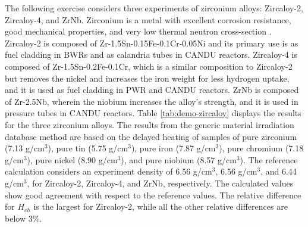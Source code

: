 The following exercise considers three experiments of zirconium alloys: Zircaloy-2, Zircaloy-4, and ZrNb.
Zirconium is a metal with excellent corrosion resistance, good mechanical properties, and very low thermal neutron cross-section \cite{zircaloy}.
Zircaloy-2 is composed of Zr-1.5Sn-0.15Fe-0.1Cr-0.05Ni and its primary use is as fuel cladding in \glspl*{BWR} and as calandria tubes in CANDU reactors.
Zircaloy-4 is composed of Zr-1.5Sn-0.2Fe-0.1Cr, which is a similar composition to Zircaloy-2 but removes the nickel and increases the iron weight for less hydrogen uptake, and it is used as fuel cladding in \gls*{PWR} and CANDU reactors.
ZrNb is composed of Zr-2.5Nb, wherein the niobium increases the alloy's strength, and it is used in pressure tubes in CANDU reactors.
%
Table \ref{tab:demo-zircaloy} displays the results for the three zirconium alloys.
The results from the generic material irradiation database method are based on the delayed heating of samples of pure zirconium (7.13 g/cm$^3$), pure tin (5.75 g/cm$^3$), pure iron (7.87 g/cm$^3$), pure chromium (7.18 g/cm$^3$), pure nickel (8.90 g/cm$^3$), and pure niobium (8.57 g/cm$^3$).
The reference calculation considers an experiment density of 6.56 g/cm$^3$, 6.56 g/cm$^3$, and 6.44 g/cm$^3$, for Zircaloy-2, Zircaloy-4, and ZrNb, respectively.
The calculated values show good agreement with respect to the reference values.
The relative difference for $H_{ch}$ is the largest for Zircaloy-2, while all the other relative differences are below 3\%.

